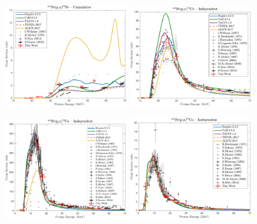 \begin{figure}
 \centering
 \includegraphics[width=0.49\textwidth]{./figures/52Fe.pdf}
 \includegraphics[width=0.49\textwidth]{./figures/55Co.pdf}

 \includegraphics[width=0.49\textwidth]{./figures/56Co.pdf}
 \includegraphics[width=0.49\textwidth]{./figures/57Co.pdf}
 

\end{figure}
